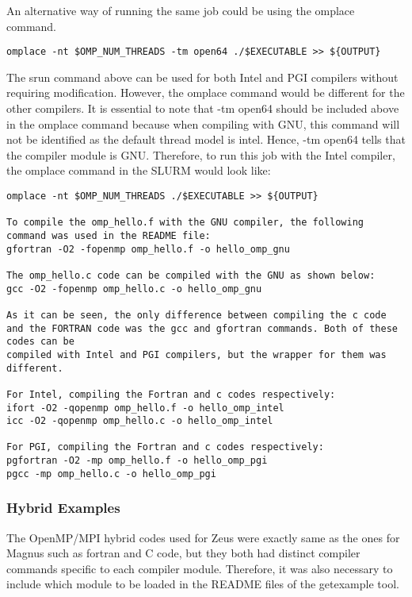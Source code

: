 \documentclass[journal]{IEEEtran}
\begin{document}
An alternative way of running the same job could be using the omplace command.

\begin{verbatim}
omplace -nt $OMP_NUM_THREADS -tm open64 ./$EXECUTABLE >> ${OUTPUT}
\end{verbatim}

The srun command above can be used for both Intel and PGI compilers without requiring modification. However, the omplace command would be different for
the other compilers. It is essential to note that -tm open64 should be included above in the omplace command because when compiling with GNU, this 
command will not be identified as the default thread model is intel. Hence, -tm open64 tells that the compiler module is GNU. Therefore, to run this job
with the Intel compiler, the omplace command in the SLURM would look like:

\begin{verbatim}
omplace -nt $OMP_NUM_THREADS ./$EXECUTABLE >> ${OUTPUT}

To compile the omp_hello.f with the GNU compiler, the following command was used in the README file:
gfortran -O2 -fopenmp omp_hello.f -o hello_omp_gnu

The omp_hello.c code can be compiled with the GNU as shown below:
gcc -O2 -fopenmp omp_hello.c -o hello_omp_gnu

As it can be seen, the only difference between compiling the c code and the FORTRAN code was the gcc and gfortran commands. Both of these codes can be 
compiled with Intel and PGI compilers, but the wrapper for them was different.

For Intel, compiling the Fortran and c codes respectively:
ifort -O2 -qopenmp omp_hello.f -o hello_omp_intel
icc -O2 -qopenmp omp_hello.c -o hello_omp_intel

For PGI, compiling the Fortran and c codes respectively:
pgfortran -O2 -mp omp_hello.f -o hello_omp_pgi
pgcc -mp omp_hello.c -o hello_omp_pgi
\end{verbatim}


\subsubsection{Hybrid Examples}

The OpenMP/MPI hybrid codes used for Zeus were exactly same as the ones for Magnus such as fortran and C code, but they both had
distinct compiler commands specific to each compiler module. Therefore, it was also necessary to include which module to be loaded in the README files
of the getexample tool.
\end{document}
